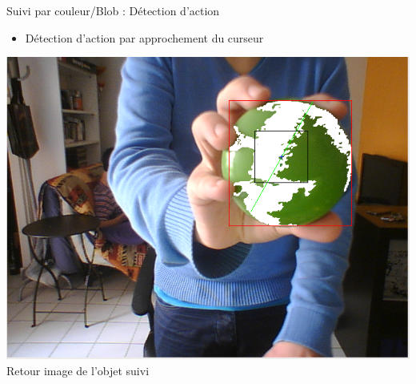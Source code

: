 \documentclass{beamer}
\begin{document}
            \begin{frame}{Suivi par couleur/Blob : Détection d'action}
                  \begin{itemize}
                        \item{Détection d'action par approchement du curseur}
                  \end{itemize}
                  \begin{center}
                        \includegraphics[scale=0.25]{Capture3.png}\\
                        Retour image de l'objet suivi
                  \end{center}
            \end{frame}
            
\end{document}
